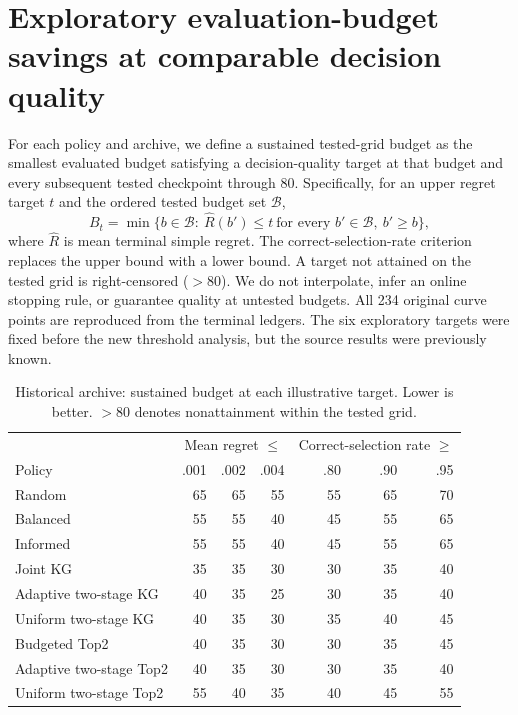 \section{Exploratory evaluation-budget savings at comparable decision quality}
\label{app:budget-savings}
For each policy and archive, we define a sustained tested-grid budget as the smallest evaluated budget satisfying a decision-quality target at that budget and every subsequent tested checkpoint through 80. Specifically, for an upper regret target $t$ and the ordered tested budget set $\mathcal B$,
\[
 B_t=\min\{b\in\mathcal B:\ \widehat R(b')\le t\ \text{for every } b'\in\mathcal B,\ b'\ge b\},
\]
where $\widehat R$ is mean terminal simple regret. The correct-selection-rate criterion replaces the upper bound with a lower bound. A target not attained on the tested grid is right-censored ($>80$). We do not interpolate, infer an online stopping rule, or guarantee quality at untested budgets. All 234 original curve points are reproduced from the terminal ledgers. The six exploratory targets were fixed before the new threshold analysis, but the source results were previously known.
\begin{table}[htbp]
\centering\small
\caption{Historical archive: sustained budget at each illustrative target. Lower is better. $>80$ denotes nonattainment within the tested grid.}
\begin{tabular}{lrrrrrr}
\toprule
& \multicolumn{3}{c}{Mean regret $\le$} & \multicolumn{3}{c}{Correct-selection rate $\ge$}\\
Policy & .001 & .002 & .004 & .80 & .90 & .95\\
\midrule
Random & 65 & 65 & 55 & 55 & 65 & 70\\
Balanced & 55 & 55 & 40 & 45 & 55 & 65\\
Informed & 55 & 55 & 40 & 45 & 55 & 65\\
Joint KG & 35 & 35 & 30 & 30 & 35 & 40\\
Adaptive two-stage KG & 40 & 35 & 25 & 30 & 35 & 40\\
Uniform two-stage KG & 40 & 35 & 30 & 35 & 40 & 45\\
Budgeted Top2 & 40 & 35 & 30 & 30 & 35 & 45\\
Adaptive two-stage Top2 & 40 & 35 & 30 & 30 & 35 & 40\\
Uniform two-stage Top2 & 55 & 40 & 35 & 40 & 45 & 55\\
\bottomrule
\end{tabular}
\end{table}
